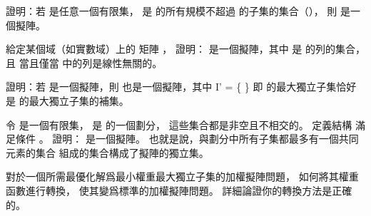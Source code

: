 \startsection[
  title={Matroids and greedy methods},
]

\startEXERCISE
證明：若  是任意一個有限集，  是  的所有規模不超過  的子集的集合（），
則  是一個擬陣。
\stopEXERCISE

\startANSWER
{}
\stopANSWER

\startEXERCISE\DIFFICULT
給定某個域（如實數域）上的  矩陣 ，
證明：  是一個擬陣，其中  是  的列的集合，
且  當且僅當  中的列是線性無關的。
\stopEXERCISE

\startANSWER
{}
\stopANSWER

\startEXERCISE
證明：若  是一個擬陣，則  也是一個擬陣，其中
\startformula
I' = \{  \}
\stopformula
即  的最大獨立子集恰好是  的最大獨立子集的補集。
\stopEXERCISE

\startANSWER
{}
\stopANSWER

\startEXERCISE\DIFFICULT
令  是一個有限集，  是  的一個劃分，
這些集合都是非空且不相交的。
定義結構  滿足條件 。
證明：  是一個擬陣。
也就是說，與劃分中所有子集都最多有一個共同元素的集合  組成的集合構成了擬陣的獨立集。
\stopEXERCISE

\startANSWER
{}
\stopANSWER

\startEXERCISE
對於一個所需最優化解爲{\EMP 最小權重}最大獨立子集的加權擬陣問題，
如何將其權重函數進行轉換，
使其變爲標準的加權擬陣問題。
詳細論證你的轉換方法是正確的。
\stopEXERCISE

\startANSWER
{}
\stopANSWER

\stopsection
